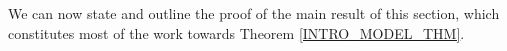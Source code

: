 \documentclass[a4paper,10pt
,draft
]{article}%
\renewcommand{\F}{\mathcal F}
\renewcommand{\1}{\eta}%
\begin{document}




We can now state and outline the proof of the main result of this section,
which constitutes most of the work towards Theorem \ref{INTRO_MODEL_THM}. %
\end{document}
